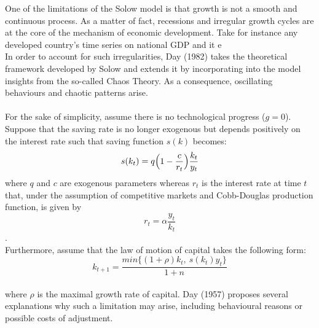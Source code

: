 One of the limitations of the Solow model is that growth is not a smooth and continuous process. As a matter of fact, recessions and irregular growth cycles are at the core of the mechanism of economic development. Take for instance any developed country's time series on national GDP and it e \\In order to account for such irregularities, Day (1982) takes the theoretical framework developed by Solow and extends it by incorporating into the model insights from the so-called Chaos Theory. As a consequence, oscillating behaviours and chaotic patterns arise.
\\
\\
For the sake of simplicity, assume there is no technological progress ($g=0$).
Suppose that the saving rate is no longer exogenous but depends positively on the interest rate such that saving function $s(k)$ becomes:
$$s(k_t)=q\Big{(}1-\frac{c}{r_t}\Big{)}\frac{k_t}{y_t}$$
where $q$ and $c$ are exogenous parameters whereas $r_t$ is the interest rate at time $t$ that, under the assumption of competitive markets and Cobb-Douglas production function, is given by 
$$r_t=\alpha \frac{y_t}{k_t}$$.
\\
Furthermore, assume that the law of motion of capital takes the following form: 
$$k_{t+1}=\frac{min\{ (1+\rho) k_{t}, \ s(k_t)y_t \} }{1+n}$$
\\
where $\rho$ is the maximal growth rate of capital. Day (1957) proposes several explanations why such a limitation may arise, including behavioural reasons or possible costs of adjustment.
